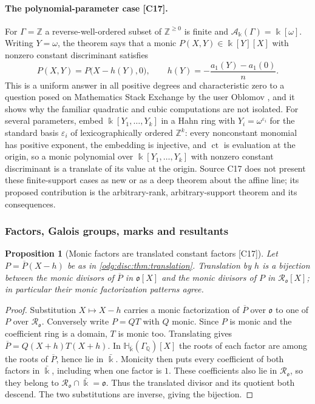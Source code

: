\documentclass[11pt,oneside]{article}
\numberwithin{equation}{section}
\newtheorem{proposition}[proposition]{Proposition}
\theoremstyle{definition}
\theoremstyle{remark}
\newcommand{\Z}{\mathbb Z}
\newcommand{\Q}{\mathbb Q}
\newcommand{\ct}{\operatorname{ct}}
\newcommand{\src}[1]{\textup{\textsf{\small[#1]}}}
\newcommand{\crA}{\mathcal A_\Bbbk(\Gamma)}
\newcommand{\Hbar}{\mathbb H_{\bar\Bbbk}(\Gamma_\Q)}
\begin{document}
\paragraph{The polynomial-parameter case \src{C17}.} For $\Gamma=\Z$ a reverse-well-ordered
subset of $\Z^{\ge0}$ is finite and $\crA=\Bbbk[\omega]$. Writing $Y=\omega$, the theorem
says that a monic $P(X,Y)\in\Bbbk[Y][X]$ with nonzero constant discriminant satisfies
\[
 P(X,Y)=P\bigl(X-h(Y),0\bigr),\qquad h(Y)=-\frac{a_1(Y)-a_1(0)}n .
\]
This is a uniform answer in all positive degrees and characteristic zero to a question posed on
Mathematics Stack Exchange by the user Oblomov \cite{Oblomov}, and it shows why the
familiar quadratic and cubic computations are not isolated. For several parameters,
embed $\Bbbk[Y_1,\ldots,Y_k]$ in a Hahn ring with $Y_i=\omega^{\varepsilon_i}$ for the
standard basis $\varepsilon_i$ of lexicographically ordered $\Z^k$: every nonconstant
monomial has positive exponent, the embedding is injective, and $\ct$ is evaluation at the
origin, so a monic polynomial over $\Bbbk[Y_1,\ldots,Y_k]$ with nonzero constant
discriminant is a translate of its value at the origin. Source C17 does not present these
finite-support cases as new or as a deep theorem about the affine line; its proposed
contribution is the arbitrary-rank, arbitrary-support theorem and its consequences.

\subsubsection{Factors, Galois groups, marks and resultants}\label{odg:disc:sub:consequences}

\begin{proposition}[Monic factors are translated constant factors \src{C17}]\label{odg:disc:prop:factors}
Let $P=\overline P(X-h)$ be as in \cref{odg:disc:thm:translation}. Translation by $h$ is a
bijection between the monic divisors of $\overline P$ in $\mathfrak o[X]$ and the monic
divisors of $P$ in $\mathcal R_{\mathfrak o}[X]$; in particular their monic factorization
patterns agree.
\end{proposition}
\begin{proof}
Substitution $X\mapsto X-h$ carries a monic factorization of $\overline P$ over
$\mathfrak o$ to one of $P$ over $\mathcal R_{\mathfrak o}$. Conversely write $P=QT$
with $Q$ monic. Since $P$ is monic and the coefficient ring is a domain, $T$ is monic
too. Translating gives $\overline P=Q(X+h)T(X+h)$. In $\Hbar[X]$ the roots of each
factor are among the roots of $\overline P$, hence lie in $\bar\Bbbk$. Monicity then
puts every coefficient of both factors in $\bar\Bbbk$, including when one factor is
$1$. These coefficients also lie in $\mathcal R_{\mathfrak o}$, so they belong to
$\mathcal R_{\mathfrak o}\cap\bar\Bbbk=\mathfrak o$. Thus the translated divisor and
its quotient both descend. The two substitutions are inverse, giving the bijection.
\end{proof}
\end{document}
